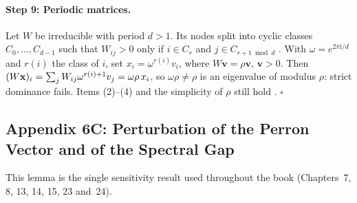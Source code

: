\documentclass[../structural_economics_book.tex]{subfiles}
\begin{document}
\paragraph{Step 9: Periodic matrices.} Let $W$ be irreducible with period $d > 1$. Its nodes split into cyclic classes $C_0, \ldots, C_{d-1}$ such that $W_{ij} > 0$ only if $i \in C_r$ and $j \in C_{r+1 \bmod d}$ \citep[Ch.~1]{seneta2006nonnegative}. With $\omega = e^{2\pi\mathrm{i}/d}$ and $r(i)$ the class of $i$, set $x_i = \omega^{r(i)}v_i$, where $W\mathbf{v} = \rho\mathbf{v}$, $\mathbf{v} > 0$. Then $(W\mathbf{x})_i = \sum_j W_{ij}\omega^{r(i)+1}v_j = \omega\rho\,x_i$, so $\omega\rho \neq \rho$ is an eigenvalue of modulus $\rho$: strict dominance fails. Items (2)--(4) and the simplicity of $\rho$ still hold \citep[Thm.~1.5]{seneta2006nonnegative}. $\square$

\subsection*{Appendix 6C: Perturbation of the Perron Vector and of the Spectral Gap}
\label{ch06:app:perturbation}

This lemma is the single sensitivity result used throughout the book (Chapters~7, 8, 13, 14, 15, 23 and~24).
\end{document}
